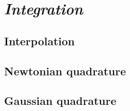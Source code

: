 \chapter{\emph{Integration}} 
\label{integration}


\section{Interpolation}
\section{Newtonian quadrature}
\section{Gaussian quadrature}

